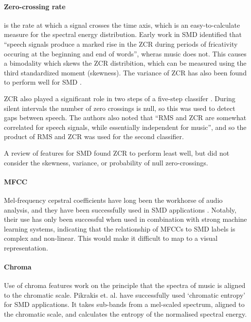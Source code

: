 \paragraph{Zero-crossing rate} is the rate at which a signal crosses the time
axis, which is an easy-to-calculate measure for the spectral energy
distribution. Early work in SMD \citep{Saunders1996} identified that ``speech
signals produce a marked rise in the ZCR during periods of fricativity occuring
at the beginning and end of words'', wheras music does not. This causes a
bimodality which skews the ZCR distribition, which can be measured using the
third standardized moment (skewness). The variance of ZCR has also been found
to perform well for SMD \citep{Scheirer1997}.

ZCR also played a significant role in two steps of a five-step classifer
\citep{Panagiotakis2005}. During silent intervals the number of zero crossings
is null, so this was used to detect gaps between speech. The authors also noted
that ``RMS and ZCR are somewhat correlated for speech signals, while
essentially independent for music'', and so the product of RMS and ZCR was used
for the second classifier.

A review \citep{Carey1999} of features for SMD found ZCR to perform least well,
but did not consider the skewness, variance, or probability of null
zero-crossings.

\paragraph{MFCC}
Mel-frequency cepstral coefficients have long been the workhorse of audio
analysis, and they have been successfully used in SMD applications
\citep{Carey1999,Liang2005,Pikrakis2008,Pikrakis2006a,Sell2014,Wieser2014}.
Notably, their use has only been successful when used in combination with
strong machine learning systems, indicating that the relationship of MFCCs to
SMD labels is complex and non-linear. This would make it difficult to map to a
visual representation.

\paragraph{Chroma}
Use of chroma features work on the principle that the spectra of music is
aligned to the chromatic scale. Pikrakis et. al.
\citep{Pikrakis2006,Pikrakis2008} have successfully used `chromatic entropy' for
SMD applications. It takes sub-bands from a mel-scaled spectrum, aligned to the
chromatic scale, and calculates the entropy of the normalised spectral energy.

